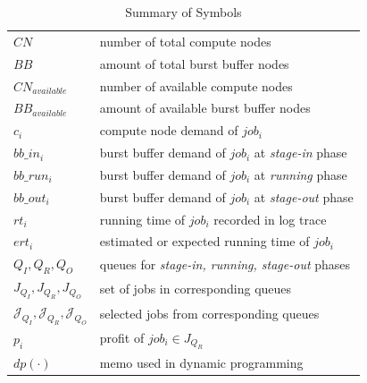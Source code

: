 

\begin{table}[ht] 
        \renewcommand{\arraystretch}{1.3}
        \caption{Summary of Symbols}
        \label{Tab:Symbols}
        \centering
        \begin{tabular}{l|l}
                \hline
                $CN$ & number of total compute nodes \\
                $BB$ & amount of total burst buffer nodes \\
                $CN_{available}$ & number of available compute nodes \\
                $BB_{available}$ & amount of available burst buffer nodes \\
                $c_i$ & compute node demand of $job_i$ \\
                $bb\_in_i$ & burst buffer demand of $job_i$ at \textit{stage-in} phase \\
                $bb\_run_i$ & burst buffer demand of $job_i$ at \textit{running} phase \\
                $bb\_out_i$ & burst buffer demand of $job_i$ at \textit{stage-out} phase \\
                $rt_i$ & running time of $job_i$ recorded in log trace \\
                $ert_i$ & estimated or expected running time of $job_i$ \\
                $Q_I, Q_R, Q_O$ & queues for \textit{stage-in, running, stage-out} phases \\
                $J_{Q_I}, J_{Q_R}, J_{Q_O}$ & set of jobs in corresponding queues \\
                $\mathcal{J}_{Q_I}, \mathcal{J}_{Q_R}, \mathcal{J}_{Q_O}$ & selected jobs from corresponding queues\\
                $p_i$ & profit of $job_i \in J_{Q_R}$ \\
                $dp(\cdot)$ & memo used in dynamic programming \\
                \hline
        \end{tabular}
\end{table}

